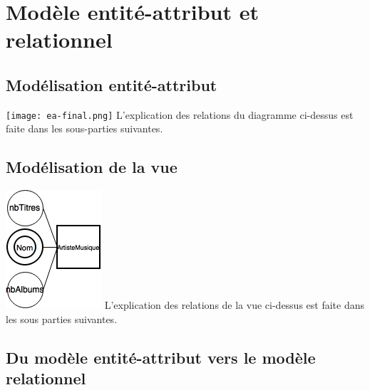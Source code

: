 \documentclass[a4paper,12pt, french]{report}
\begin{document}
\chapter{Modèle entité-attribut et relationnel}
\section{Modélisation entité-attribut}
  \texttt{[image: ea-final.png]}
  L'explication des relations du diagramme ci-dessus est faite dans les sous-parties suivantes.
\section{Modélisation de la vue}
  \includegraphics[scale=0.7]{vues.png}
  L'explication des relations de la vue ci-dessus est faite dans les sous parties suivantes.
\section{Du modèle entité-attribut vers le modèle relationnel}
\end{document}
